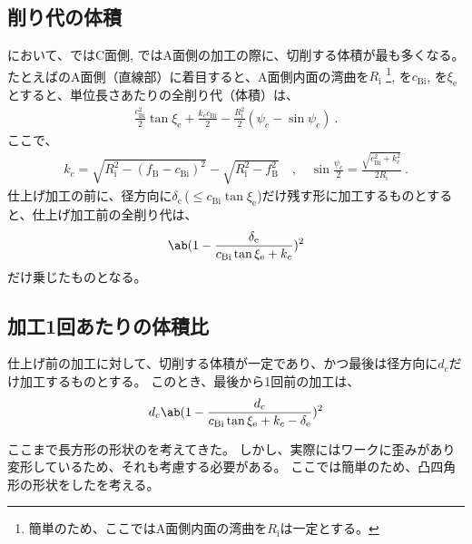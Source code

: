 \subsection{削り代の体積}
\EndFaceChamferMilling において、\EndFaceOutChamferMilling ではC面側, \EndFaceInChamferMilling ではA面側の加工の際に、切削する体積が最も多くなる。
たとえば\BottomEndFaceInCChamfer のA面側（直線部）に着目すると、A面側内面の湾曲を$R_\mathrm i$%
\footnote{簡単のため、ここではA面側内面の湾曲を$R_\mathrm i$は一定とする。},
\EndFaceInCChamferLength を$c_\mathrm{Bi}$, \EndFaceInCChamferAngle を$\xi_\mathrm e$とすると、単位長さあたりの全削り代（体積）は、
\begin{align*}
  \frac{c_\mathrm{Bi}^2}2\tan\xi_\mathrm e
  +\frac{k_cc_\mathrm{Bi}}2
  -\frac{R_\mathrm i^2}2(\psi_c-\sin\psi_c)\ .
\end{align*}
ここで、
\begin{align*}
  k_c = \sqrt{R_\mathrm i^2-(f_\mathrm B-c_\mathrm{Bi})^2}
        -\sqrt{R_\mathrm i^2-f_\mathrm B^2}\quad, \quad
  \sin\frac{\psi_c}2 = \frac{\sqrt{c_\mathrm{Bi}^2+k_c^2}}{2R_\mathrm i}\ .
\end{align*}
仕上げ加工の前に、径方向に$\delta_\mathrm c$\,($\leq c_\mathrm{Bi}\tan\xi_\mathrm e$)だけ残す形に加工するものとすると、仕上げ加工前の全削り代は、
\begin{align*}
  \ab(1-\frac{\delta_\mathrm e}{c_\mathrm{Bi}\tan\xi_\mathrm e+k_c})^2
\end{align*}
だけ乗じたものとなる。


\subsection{加工1回あたりの体積比\TBW}
仕上げ前の加工に対して、切削する体積が一定であり、かつ最後は径方向に$d_c$だけ加工するものとする。
このとき、最後から1回前の加工は、
\begin{align*}
  d_c\ab(1-\frac{d_c}{c_\mathrm{Bi}\tan\xi_\mathrm e+k_c-\delta_\mathrm e})^2
\end{align*}



\clearpage
ここまで長方形の形状の\EndFaceCChamferMilling を考えてきた。
しかし、実際にはワークに歪みがあり変形しているため、それも考慮する必要がある。
ここでは簡単のため、凸四角形の形状をした\EndFaceCChamferMilling を考える。


